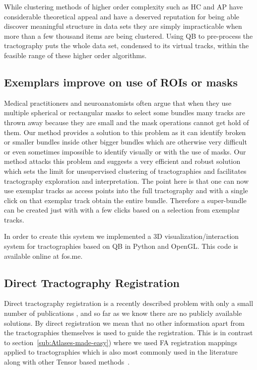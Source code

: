 \documentclass[preprint,authoryear,a4paper,10pt,onecolumn]{elsarticle}
\begin{document}
While clustering methods of higher order complexity such as HC and AP
have considerable theoretical appeal and have a deserved reputation for
being able discover meaningful structure in data sets they are simply
impracticable when more than a few thousand items are being
clustered. Using QB to pre-process the tractography puts the whole data
set, condensed to its virtual tracks, within the feasible range of these
higher order algorithms.

\subsection{Exemplars improve on use of ROIs or masks}

Medical practitioners and neuroanatomists often argue that when they use
multiple spherical or rectangular masks to select some bundles many
tracks are thrown away because they are small and the mask operations
cannot get hold of them. Our method provides a solution to this problem
as it can identify broken or smaller bundles inside other bigger bundles
which are otherwise very difficult or even sometimes impossible to
identify visually or with the use of masks. Our method attacks this
problem and suggests a very efficient and robust solution which sets the
limit for unsupervised clustering of tractographies and facilitates
tractography exploration and interpretation. The point here is that one
can now use exemplar tracks as access points into the full tractography
and with a single click on that exemplar track obtain the entire bundle.
Therefore a super-bundle can be created just with with a few clicks
based on a selection from exemplar tracks.

In order to create this system we implemented a 3D
visualization/interaction system for tractographies based on QB in
Python and OpenGL. This code is available online at fos.me.


\subsection{Direct Tractography Registration}

Direct tractography registration is a recently described problem with
only a small number of publications \citep{leemans2006multiscale,
  mayer2008bundles, mayerdirect, mayer2011supervised,
  durrleman2010registration, zvitia2008adaptive, Zvitia2010,
  ZiyanMICCAI07}, and so far as we know there are no publicly available
solutions. By direct registration we mean that no other information
apart from the tractographies themselves is used to guide the
registration. This is in contrast to
section~\ref{sub:Atlases-made-easy}) where we used FA registration
mappings applied to tractographies which is also most commonly used in
the literature along with other Tensor based
methods~\citep{goh2006algebraic}.
\end{document}
